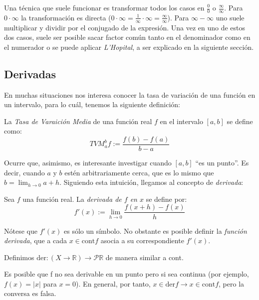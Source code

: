 \documentclass[10pt]{article}
\newcommand{\R}{\mathbb{R}}
\begin{document}
Una técnica que suele funcionar es transformar todos los casos en $ \frac{0}{0} $ o $ \frac{\infty}{\infty} $. Para $ 0 \cdot \infty $ la transformación es directa ($ 0 \cdot \infty =
\frac{1}{\infty} \cdot \infty = \frac{\infty}{\infty} $). Para $ \infty - \infty $ uno suele multiplicar y dividir por el conjugado de la expresión. Una vez en uno de estos dos casos,
suele ser posible sacar factor común tanto en el denominador como en el numerador o se puede aplicar \textit{L'Hopital}, a ser explicado en la siguiente sección.

\subsection{Derivadas}

En muchas situaciones nos interesa conocer la tasa de variación de una función en un intervalo, para lo cuál, tenemos la siguiente definición:

\begin{definition}
  La \textit{Tasa de Varaición Media} de una función real $ f $ en el intervalo $ \left[a, b\right] $ se define como:
  \[ TV\!M_a^b f := \frac{f(b) - f(a)}{b - a} \]
\end{definition}

Ocurre que, asimismo, es interesante investigar cuando $ \left[a, b\right] $ ``es un punto''. Es decir, cuando $ a $ y $ b $ estén arbitrariamente cerca, que es lo mismo que
$ b = \lim_{h \to 0} a + h $. Siguiendo esta intuición, llegamos al concepto de \textit{derivada}:

\begin{definition}
  Sea $ f $ una función real. La \textit{derivada de $ f $ en $ x $} se define por:
  \[ f'(x) := \lim_{h \to 0} \frac{f(x + h) - f(x)}{h} \]

  Nótese que $ f'(x)$ es sólo un símbolo. No obstante es posible definir la \textit{función derivada}, que a cada $ x \in \text{cont} f$ asocia a su correspondiente $ f'(x) $.
\end{definition}

Definimos $ \text{der} : (X \to \R) \to \mathcal{P} \R $ de manera similar a cont.

\begin{remark}
  Es posible que f no sea derivable en un punto pero si sea continua (por ejemplo, $ f(x) = |x| $ para $ x = 0 $). En general, por tanto, 
  $ x \in \text{der} f \to x \in \text{cont} f $, pero la conversa es falsa.
\end{remark}
\end{document}
